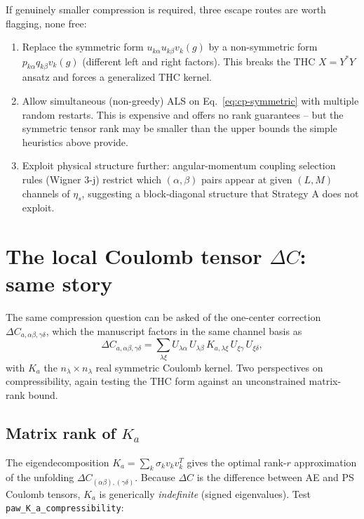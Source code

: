 \documentclass[aps,prb,reprint,superscriptaddress,nofootinbib]{revtex4-2}
\begin{document}
If genuinely smaller compression is required, three escape routes are
worth flagging, none free:
\begin{enumerate}
\item Replace the symmetric form \(u_{k\alpha}u_{k\beta}v_k(g)\) by a
non-symmetric form \(p_{k\alpha}q_{k\beta}v_k(g)\) (different left and
right factors).  This breaks the THC \(X=Y^{*}Y\) ansatz and forces a
generalized THC kernel.
\item Allow simultaneous (non-greedy) ALS on
Eq.~\eqref{eq:cp-symmetric} with multiple random restarts.  This is
expensive and offers no rank guarantees -- but the symmetric tensor
rank may be smaller than the upper bounds the simple heuristics
above provide.
\item Exploit physical structure further: angular-momentum coupling
selection rules (Wigner 3-j) restrict which \((\alpha,\beta)\) pairs
appear at given \((L,M)\) channels of \(\eta_s\), suggesting a
block-diagonal structure that Strategy A does not exploit.
\end{enumerate}

\section{The local Coulomb tensor \texorpdfstring{$\Delta C$}{Delta C}: same story}
\label{sec:deltaC}

The same compression question can be asked of the one-center correction
\(\Delta C_{a,\alpha\beta,\gamma\delta}\), which the manuscript factors
in the same channel basis as
\begin{equation}
\Delta C_{a,\alpha\beta,\gamma\delta}
=\sum_{\lambda\xi}
U_{\lambda\alpha}\,U_{\lambda\beta}\,
K_{a,\lambda\xi}\,
U_{\xi\gamma}\,U_{\xi\delta},
\label{eq:dC-K}
\end{equation}
with \(K_a\) the \(n_\lambda\times n_\lambda\) real symmetric Coulomb
kernel.  Two perspectives on compressibility, again testing the THC
form against an unconstrained matrix-rank bound.

\subsection{Matrix rank of \texorpdfstring{$K_a$}{K_a}}

The eigendecomposition \(K_a=\sum_k\sigma_k v_k v_k^{T}\) gives the
optimal rank-\(r\) approximation of the unfolding
\(\Delta C_{(\alpha\beta),(\gamma\delta)}\).  Because \(\Delta C\) is
the difference between AE and PS Coulomb tensors,
\(K_a\) is generically \emph{indefinite} (signed eigenvalues).  Test
\texttt{paw\_K\_a\_compressibility}:
\end{document}
